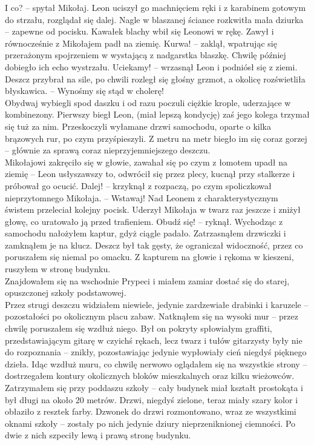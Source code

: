 \documentclass[../MAIN.tex]{subfiles}
\begin{document}
\xx I co? -- spytał Mikołaj.
\qd
Leon uciszył go machnięciem ręki i z karabinem gotowym do strzału, rozglądał się dalej. Nagle w blaszanej ściance rozkwitła mała dziurka -- zapewne od pocisku. Kawałek blachy wbił się Leonowi w rękę. Zawył i równocześnie z Mikołajem padł na ziemię.
%
\sx Kurwa! -- zaklął, wpatrując się przerażonym spojrzeniem w wystającą z nadgarstka blaszkę.
\qd
Chwilę później dobiegło ich echo wystrzału.
%
\sx Uciekamy! -- wrzasnął Leon i podniósł się z ziemi.
\qd
Deszcz przybrał na sile, po chwili rozległ się głośny grzmot, a okolicę rozświetliła błyskawica. -- Wynośmy się stąd w cholerę! \\
Obydwaj wybiegli spod daszku i od razu poczuli ciężkie krople, uderzające w kombinezony. Pierwszy biegł Leon, (miał lepszą kondycję) zaś jego kolega trzymał się tuż za nim. Przeskoczyli wyłamane drzwi samochodu, oparte o kilka brązowych rur, po czym przyśpieszyli. Z metru na metr biegło im się coraz gorzej -- głównie za sprawą coraz nieprzyjemniejszego deszczu. \\
Mikołajowi zakręciło się w głowie, zawahał się po czym z łomotem upadł na ziemię -- Leon usłyszawszy to, odwrócił się przez plecy, kucnął przy stalkerze i próbował go ocucić.
%
\sx Dalej! -- krzyknął z rozpaczą, po czym spoliczkował nieprzytomnego Mikołaja. -- Wstawaj!
\qd
Nad Leonem z charakterystycznym świstem przeleciał kolejny pocisk. Uderzył Mikołaja w twarz raz jeszcze i zniżył głowę, co uratowało ją przed trafieniem.
%
\sx Obudź się! -- ryknął.\qd
%
%
Wychodząc z samochodu nałożyłem kaptur, gdyż ciągle padało. Zatrzasnąłem drzwiczki i zamknąłem je na klucz. Deszcz był tak gęsty, że ograniczał widoczność, przez co poruszałem się niemal po omacku. Z kapturem na głowie i rękoma w kieszeni, ruszyłem w stronę budynku. \\
Znajdowałem się na wschodnie Prypeci i miałem zamiar dostać się do starej, opuszczonej szkoły podstawowej. \\
Przez strugi deszczu widziałem niewiele, jedynie zardzewiałe drabinki i karuzele -- pozostałości po okolicznym placu zabaw. Natknąłem się na wysoki mur -- przez chwilę poruszałem się wzdłuż niego. Był on pokryty spłowiałym graffiti, przedstawiającym gitarę w czyichś rękach, lecz twarz i tułów gitarzysty były nie do rozpoznania -- znikły, pozostawiając jedynie wypłowiały cień niegdyś pięknego dzieła. Idąc wzdłuż muru, co chwilę nerwowo oglądałem się na wszystkie strony -- dostrzegałem kontury okolicznych bloków mieszkalnych oraz kilku wieżowców. \\
Zatrzymałem się przy poddaszu szkoły -- cały budynek miał kształt prostokąta i był długi na około 20 metrów. Drzwi, niegdyś zielone, teraz miały szary kolor i obłaziło z resztek farby. Dzwonek do drzwi rozmontowano, wraz ze wszystkimi oknami szkoły -- zostały po nich jedynie dziury nieprzeniknionej ciemności. Po dwie z nich szpeciły lewą i prawą stronę budynku.\\
\end{document}
